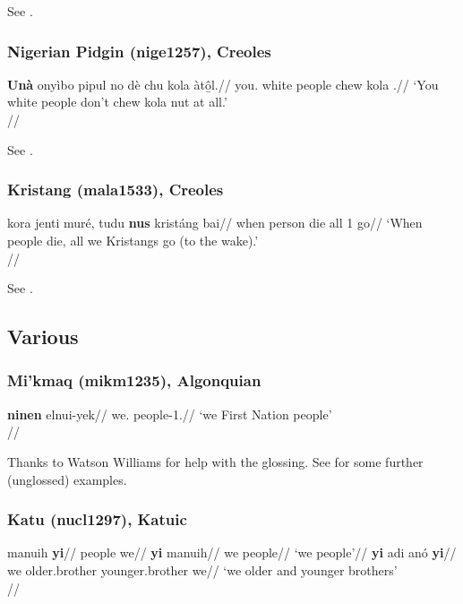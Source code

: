 \documentclass[A4paper]{article}
\begin{document}
See \citet[224, 460, 466f.]{huttarhuttar1994}.

\subsubsection{Nigerian Pidgin (nige1257), Creoles}

\ex \begingl
\gla \textbf{Unà} onyìbo pipul no dè chu kola àt\b{ô}l.//
\glb you.\Pl{} white people \Neg{} \Ipfv{} chew kola \Neg.\Emph{}//
\glft `You white people don't chew kola nut at all.'\\\citep[after][181, (802)]{faraclas1996}//
\endgl
\xe

See \citet[178, 181]{faraclas1996}.

\subsubsection{Kristang (mala1533), Creoles}

\ex
\begingl
\gla  kora jenti muré, tudu \textbf{nus} kristáng bai//
\glb when person die all 1\Pl{} {} go//
\glft `When people die, all we Kristangs go (to the wake).' \\\citep[86, (11)]{baxter1988}//
\endgl
\xe

See \citet[86]{baxter1988}.


\subsection{Various}


\subsubsection{Mi'kmaq (mikm1235), Algonquian}

\ex
\begingl
\gla \textbf{ninen} elnui-yek//
\glb we.\Excl{} people-1\Pl.\Excl//
\glft `we First Nation people'\\
\citep[188]{pacifiqueetal1990}//
\endgl
\xe

Thanks to Watson Williams for help with the glossing.
See \citet[188]{pacifiqueetal1990} for some further (unglossed) examples.

\subsubsection{Katu (nucl1297), Katuic}

\pex
\a \begingl
\gla manuih \textbf{yi}//
\glb people we//
\endgl
\a 
\begingl
\gla \textbf{yi} manuih//
\glb we people//
\glft `we people'//
\endgl
\a
\begingl
\gla \textbf{yi} adi anó \textbf{yi}//
\glb we older.brother younger.brother we//
\glft `we older and younger brothers'\\
\citep[28, (35--37)]{costello1969}//
\endgl
\xe
\end{document}
